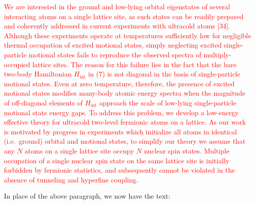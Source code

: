 \documentclass[preprint,showkeys,nofootinbib]{revtex4-1}
\renewcommand{\t}{\text} %
\newcommand{\1}{\mathds{1}}
\newcommand{\red}[1]{\textcolor{red}{#1}}
\newcounter{point}
\begin{document}
\begin{enumerate}[label=(R1.\arabic{point}.\arabic*)]
  \red{We are interested in the ground and low-lying orbital
    eigenstates of several interacting atoms on a single lattice site,
    as such states can be readily prepared and coherently addressed in
    current experiments with ultracold atoms [34].  Although these
    experiments operate at temperatures sufficiently low for
    negligible thermal occupation of excited motional states, simply
    neglecting excited single-particle motional states fails to
    reproduce the observed spectra of multiply-occupied lattice sites.
    The reason for this failure lies in the fact that the bare
    two-body Hamiltonian $H_{\t{int}}$ in (7) is not diagonal in the
    basis of single-particle motional states.  Even at zero
    temperature, therefore, the presence of excited motional states
    modifies many-body atomic energy spectra when the magnitude of
    off-diagonal elements of $H_{\t{int}}$ approach the scale of
    low-lying single-particle motional state energy gaps.  To address
    this problem, we develop a low-energy effective theory for
    ultracold two-level fermionic atoms on a lattice.  As our work is
    motivated by progress in experiments which initialize all atoms in
    identical (i.e.~ground) orbital and motional states, to simplify
    our theory we assume that any $N$ atoms on a single lattice site
    occupy $N$ nuclear spin states.  Multiple occupation of a single
    nuclear spin state on the same lattice site is initially forbidden
    by fermionic statistics, and subsequently cannot be violated in
    the absence of tunneling and hyperfine coupling.}

  In place of the above paragraph, we now have the text:


\end{enumerate}
\end{document}
